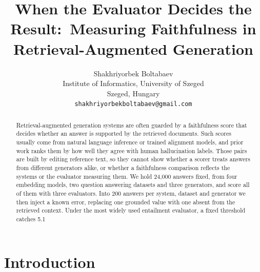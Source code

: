 \documentclass[11pt]{article}
\title{When the Evaluator Decides the Result:\
       Measuring Faithfulness in Retrieval-Augmented Generation}
\author{Shakhriyorbek Boltabaev \\
  Institute of Informatics, University of Szeged \\
  Szeged, Hungary \\
  \texttt{shakhriyorbekboltabaev@gmail.com}}
\begin{document}
\maketitle

\begin{abstract}
Retrieval-augmented generation systems are often guarded by a faithfulness score that decides whether an answer is supported by the retrieved documents. Such scores usually come from natural language inference or trained alignment models, and prior work ranks them by how well they agree with human hallucination labels. Those pairs are built by editing reference text, so they cannot show whether a scorer treats answers from different generators alike, or whether a faithfulness comparison reflects the systems or the evaluator measuring them. We hold 24,000 answers fixed, from four embedding models, two question answering datasets and three generators, and score all of them with three evaluators. Into 200 answers per system, dataset and generator we then inject a known error, replacing one grounded value with one absent from the retrieved context. Under the most widely used entailment evaluator, a fixed threshold catches 5.1%
\end{abstract}

\section{Introduction}
\label{sec:intro}
 
\end{document}
